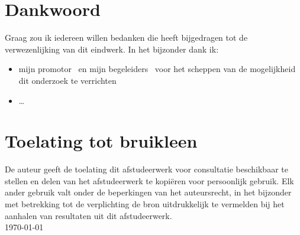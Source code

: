 \newpage
\thispagestyle{plain}

\section*{Dankwoord}
Graag zou ik iedereen willen bedanken die heeft bijgedragen tot de
verwezenlijking van dit eindwerk. In het bijzonder dank ik:
\begin{itemize}
  \item mijn promotor \promotor\ en mijn begeleiders \begeleider\ voor het scheppen van de
mogelijkheid dit onderzoek te verrichten
  \item \ldots
\end{itemize}
\vfill


\section*{Toelating tot bruikleen}
De auteur geeft de toelating dit afstudeerwerk voor consultatie 
beschikbaar te stellen en delen van het afstudeerwerk te kopi\"eren voor
persoonlijk gebruik. Elk ander gebruik valt onder de beperkingen van het 
auteursrecht, in het bijzonder met betrekking tot de verplichting de bron 
uitdrukkelijk te vermelden bij het aanhalen van resultaten uit dit 
afstudeerwerk.
\\[1cm]
\auteur\hfill \today
\\[1cm]